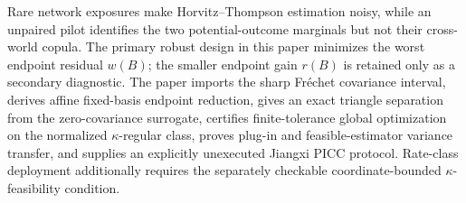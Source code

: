 Rare network exposures make Horvitz--Thompson estimation noisy, while an unpaired pilot identifies the two potential-outcome marginals but not their cross-world copula.  The primary robust design in this paper minimizes the worst endpoint residual \(w(B)\); the smaller endpoint gain \(r(B)\) is retained only as a secondary diagnostic.  The paper imports the sharp Fr\'echet covariance interval, derives affine fixed-basis endpoint reduction, gives an exact triangle separation from the zero-covariance surrogate, certifies finite-tolerance global optimization on the normalized \(\kappa\)-regular class, proves plug-in and feasible-estimator variance transfer, and supplies an explicitly unexecuted Jiangxi PICC protocol.  Rate-class deployment additionally requires the separately checkable coordinate-bounded \(\kappa\)-feasibility condition.